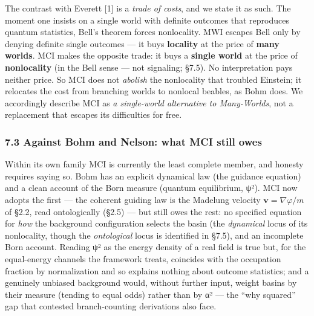 \documentclass[
]{article}
\begin{document}
The contrast with Everett {[}1{]} is a \emph{trade of costs}, and we
state it as such. The moment one insists on a single world with definite
outcomes that reproduces quantum statistics, Bell's theorem forces
nonlocality. MWI escapes Bell only by denying definite single outcomes
--- it buys \textbf{locality} at the price of \textbf{many worlds}. MCI
makes the opposite trade: it buys a \textbf{single world} at the price
of \textbf{nonlocality} (in the Bell sense --- not signaling; §7.5). No
interpretation pays neither price. So MCI does not \emph{abolish} the
nonlocality that troubled Einstein; it relocates the cost from branching
worlds to nonlocal beables, as Bohm does. We accordingly describe MCI as
\emph{a single-world alternative to Many-Worlds}, not a replacement that
escapes its difficulties for free.

\subsubsection{7.3 Against Bohm and Nelson: what MCI still
owes}\label{against-bohm-and-nelson-what-mci-still-owes}

Within its own family MCI is currently the least complete member, and
honesty requires saying so. Bohm has an explicit dynamical law (the
guidance equation) and a clean account of the Born measure (quantum
equilibrium, \textbar ψ\textbar²). MCI now adopts the first --- the
coherent guiding law is the Madelung velocity
\(\mathbf{v}=\nabla\varphi/m\) of §2.2, read ontologically (§2.5) ---
but still owes the rest: no specified equation for \emph{how} the
background configuration selects the basin (the \emph{dynamical} locus
of its nonlocality, though the \emph{ontological} locus is identified in
§7.5), and an incomplete Born account. Reading \textbar ψ\textbar² as
the energy density of a real field is true but, for the equal-energy
channels the framework treats, coincides with the occupation fraction by
normalization and so explains nothing about outcome statistics; and a
genuinely unbiased background would, without further input, weight
basins by their measure (tending to equal odds) rather than by
\textbar α\textbar² --- the ``why squared'' gap that contested
branch-counting derivations also face.
\end{document}
